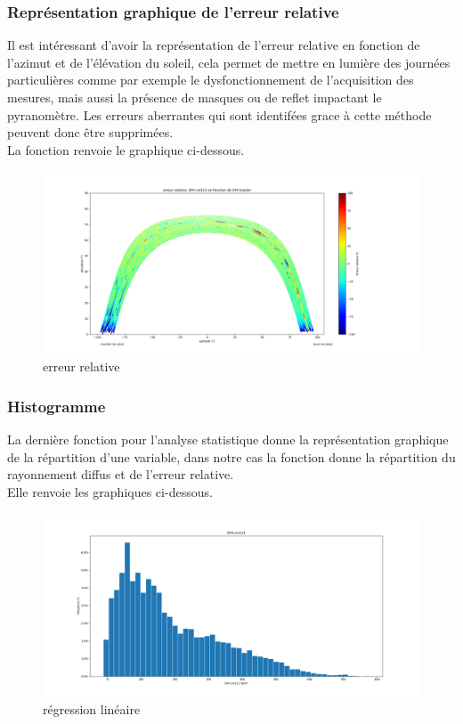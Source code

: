 \documentclass[12pt,a4paper]{article}
\begin{document}
\begin{flushleft}
\subsubsection{Représentation graphique de l'erreur relative}

Il est intéressant d'avoir la représentation de l'erreur relative en fonction de l'azimut et de l'élévation du soleil, cela permet de mettre en lumière des journées particulières comme par exemple le dysfonctionnement de l'acquisition des mesures, mais aussi la présence de masques ou de reflet impactant le pyranomètre. Les erreurs aberrantes qui sont identifées grace à cette méthode peuvent donc être supprimées.\\
La fonction renvoie le graphique ci-dessous.
 
\begin{figure}[H]
\centering
\includegraphics[width=15cm]{image/erreur_relative/1.png} 
\caption{erreur relative}  
\end{figure}

\subsubsection{Histogramme}

La dernière fonction pour l'analyse statistique donne la représentation graphique de la répartition d'une variable, dans notre cas la fonction donne la répartition du rayonnement diffus et de l'erreur relative.\\
Elle renvoie les graphiques ci-dessous.
\begin{figure}[H]
\centering
\includegraphics[width=15cm]{image/histogramme/1.png} 
\caption{régression linéaire}  
\end{figure}


\end{flushleft}
\end{document}
